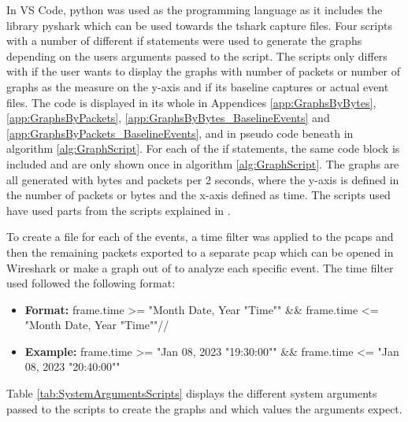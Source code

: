 In \gls{VS Code}, python was used as the programming language as it includes the library pyshark which can be used towards the tshark capture files. Four scripts with a number of different if statements were used to generate the graphs depending on the users arguments passed to the script. The scripts only differs with if the user wants to display the graphs with number of packets or number of graphs as the measure on the y-axis and if its baseline captures or actual event files. The code is displayed in its whole in Appendices \ref{app:GraphsByBytes}, \ref{app:GraphsByPackets}, \ref{app:GraphsByBytes_BaselineEvents} and \ref{app:GraphsByPackets_BaselineEvents}, and in pseudo code beneath in algorithm \ref{alg:GraphScript}. For each of the if statements, the same code block is included and are only shown once in algorithm \ref{alg:GraphScript}. The graphs are all generated with bytes and packets per 2 seconds, where the y-axis is defined in the number of packets or bytes and the x-axis defined as time. The scripts used have used parts from the scripts explained in \cite{GraphsInspiration}.

To create a file for each of the events, a time filter was applied to the pcaps and then the remaining packets exported to a separate pcap which can be opened in Wireshark or make a graph out of to analyze each specific event. The time filter used followed the following format:

\begin{itemize}
\item \textbf{Format:} frame.time >= "Month Date, Year "Time"" \&\& frame.time <= "Month Date, Year "Time""//
\item \textbf{Example:} frame.time >= "Jan 08, 2023 "19:30:00"" \&\& frame.time <= "Jan 08, 2023 "20:40:00""
\end{itemize}

Table \ref{tab:SystemArgumentsScripts} displays the different system arguments passed to the scripts to create the graphs and which values the arguments expect. 

